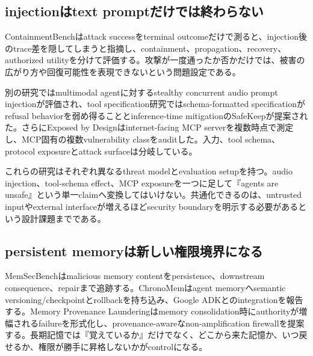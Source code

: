 \par\medskip{}
\subsection{injectionはtext promptだけでは終わらない}

ContainmentBenchはattack successをterminal outcomeだけで測ると、injection後のtrace差を隠してしまうと指摘し、containment、propagation、recovery、authorized utilityを分けて評価する。攻撃が一度通ったか否かだけでは、被害の広がり方や回復可能性を表現できないという問題設定である。\autocite{src-e08216aa168c}


別の研究ではmultimodal agentに対するstealthy concurrent audio prompt injectionが評価され、tool specification研究ではschema-formatted specificationがrefusal behaviorを弱め得ることとinference-time mitigationのSafeKeepが提案された。さらにExposed by Designはinternet-facing MCP serverを複数時点で測定し、MCP固有の複数vulnerability classをauditした。入力、tool schema、protocol exposureとattack surfaceは分岐している。\autocite{src-0ebd2e2bdbb7,src-62c4ed3c6c14,src-65271d0e1d0b}


\begin{claimboundary}
これらの研究はそれぞれ異なるthreat modelとevaluation setupを持つ。audio injection、tool-schema effect、MCP exposureを一つに足して『agents are unsafe』という単一claimへ変換してはいけない。共通化できるのは、untrusted inputやexternal interfaceが増えるほどsecurity boundaryを明示する必要があるという設計課題までである。\autocite{src-0ebd2e2bdbb7,src-62c4ed3c6c14,src-65271d0e1d0b,src-e08216aa168c}
\end{claimboundary}

\par\medskip{}
\subsection{persistent memoryは新しい権限境界になる}

MemSecBenchはmalicious memory contentをpersistence、downstream consequence、repairまで追跡する。ChronoMemはagent memoryへsemantic versioning/checkpointとrollbackを持ち込み、Google ADKとのintegrationを報告する。Memory Provenance Launderingはmemory consolidation時にauthorityが増幅されるfailureを形式化し、provenance-awareなnon-amplification firewallを提案する。長期記憶では『覚えているか』だけでなく、どこから来た記憶か、いつ戻せるか、権限が勝手に昇格しないかがcontrolになる。\autocite{src-021c5e6be64a,src-1eac9e55bab6,src-732b15b19744}


